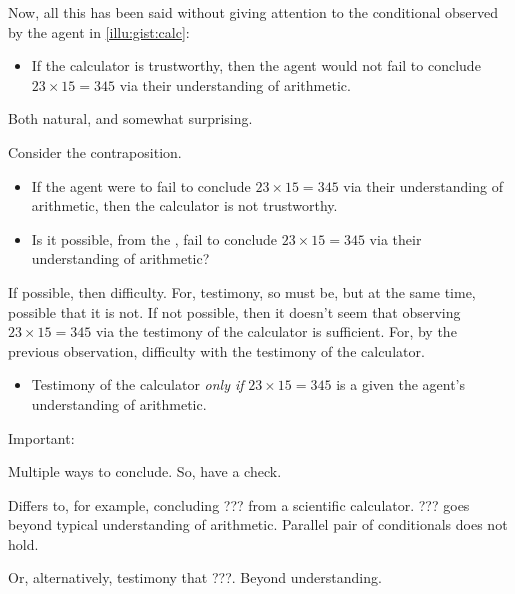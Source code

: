 \begin{note}
  Now, all this has been said without giving attention to the conditional observed by the agent in \autoref{illu:gist:calc}:

  \begin{itemize}
  \item
    If the calculator is trustworthy, then the agent would not fail to conclude \(23 \times 15 = 345\) via their understanding of arithmetic.
  \end{itemize}

  Both natural, and somewhat surprising.

  Consider the contraposition.

  \begin{itemize}
  \item
    If the agent were to fail to conclude \(23 \times 15 = 345\) via their understanding of arithmetic, then the calculator is not trustworthy.
  \end{itemize}

  \begin{itemize}
  \item
    Is it possible, from the \agpe{}, fail to conclude \(23 \times 15 = 345\) via their understanding of arithmetic?
  \end{itemize}

  If possible, then difficulty.
  For, testimony, so must be, but at the same time, possible that it is not.
  If not possible, then it doesn't seem that observing \(23 \times 15 = 345\) via the testimony of the calculator is sufficient.
  For, by the previous observation, difficulty with the testimony of the calculator.

  \begin{itemize}
  \item
    Testimony of the calculator \emph{only if} \(23 \times 15 = 345\) is a  given the agent's understanding of arithmetic.
  \end{itemize}
\end{note}

\begin{note}
  Important:

  Multiple ways to conclude.
  So, have a check.

  Differs to, for example, concluding {\color{red} ???} from a scientific calculator.
  {\color{red} ???} goes beyond typical understanding of arithmetic.
  Parallel pair of conditionals does not hold.

  Or, alternatively, testimony that {\color{red} ???}.
  Beyond understanding.
\end{note}


